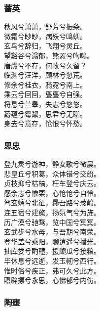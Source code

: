 \documentclass[]{article}
\begin{document}
\hypertarget{header-n297}{%
\subsubsection{蓄英}\label{header-n297}}

秋风兮萧萧，舒芳兮振条。\\
微霜兮眇眇，病殀兮鸣蜩。\\
玄鸟兮辞归，飞翔兮灵丘。\\
望谿谷兮滃郁，熊罴兮呴嗥。\\
唐虞兮不存，何故兮久留？\\
临渊兮汪洋，顾林兮忽荒。\\
修余兮袿衣，骑霓兮南上。\\
乘云兮回回，亹亹兮自强。\\
将息兮兰皋，失志兮悠悠。\\
蒶蕴兮霉黧，思君兮无聊。\\
身去兮意存，怆恨兮怀愁。

\hypertarget{header-n302}{%
\subsubsection{思忠}\label{header-n302}}

登九灵兮游神，静女歌兮微晨。\\
悲皇丘兮积葛，众体错兮交纷。\\
贞枝抑兮枯槁，枉车登兮庆云。\\
感余志兮惨栗，心怆怆兮自怜。\\
驾玄螭兮北征，曏吾路兮葱岭。\\
连五宿兮建旄，扬氛气兮为旌。\\
历广漠兮驰骛，览中国兮冥冥。\\
玄武步兮水母，与吾期兮南荣。\\
登华盖兮乘阳，聊逍遥兮播光。\\
抽库娄兮酌醴，援瓟瓜兮接粮。\\
毕休息兮远逝，发玉軔兮西行。\\
惟时俗兮疾正，弗可久兮此方。\\
寤辟摽兮永思，心怫郁兮内伤。

\hypertarget{header-n307}{%
\subsubsection{陶壅}\label{header-n307}}
\end{document}
